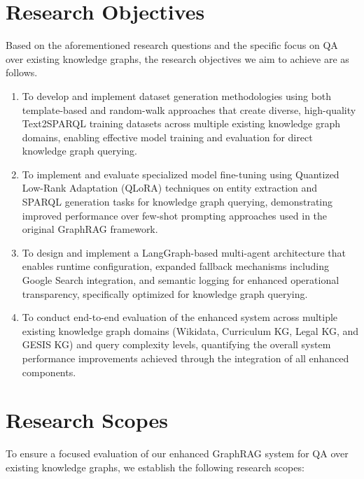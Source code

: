 \section{Research Objectives}
\label{sec:tujuan}
Based on the aforementioned research questions and the specific focus on QA over existing knowledge graphs, the research objectives we aim to achieve are as follows.

\begin{enumerate}
    \item To develop and implement dataset generation methodologies using both template-based and random-walk approaches that create diverse, high-quality Text2SPARQL training datasets across multiple existing knowledge graph domains, enabling effective model training and evaluation for direct knowledge graph querying.
    
    \item To implement and evaluate specialized model fine-tuning using Quantized Low-Rank Adaptation (QLoRA) techniques on entity extraction and SPARQL generation tasks for knowledge graph querying, demonstrating improved performance over few-shot prompting approaches used in the original GraphRAG framework.
    
    \item To design and implement a LangGraph-based multi-agent architecture that enables runtime configuration, expanded fallback mechanisms including Google Search integration, and semantic logging for enhanced operational transparency, specifically optimized for knowledge graph querying.

    \item To conduct end-to-end evaluation of the enhanced system across multiple existing knowledge graph domains (Wikidata, Curriculum KG, Legal KG, and GESIS KG) and query complexity levels, quantifying the overall system performance improvements achieved through the integration of all enhanced components.
    
\end{enumerate}

\section{Research Scopes}
\label{sec:batasanPenelitian}
To ensure a focused evaluation of our enhanced GraphRAG system for QA over existing knowledge graphs, we establish the following research scopes:

